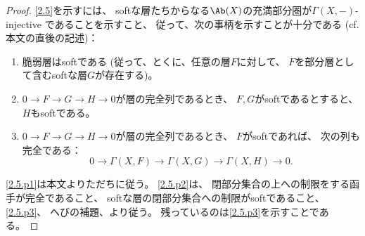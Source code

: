 \documentclass[uplatex,dvipdfmx]{jsarticle}
\begin{document}
\begin{proof}
  \autoref{2.5}を示すには、
  softな層たちからなる\(\Ab(X)\)の充満部分圏が\(\Gamma(X,-)\)-injective
  であることを示すこと、
  従って、次の事柄を示すことが十分である
  (cf. 本文\cite[Definition 1.8.2]{kashiwara2002sheaves}の直後の記述)：
  \begin{enumerate}
    \item \label{2.5.p1}
    脆弱層はsoftである
    (従って、とくに、任意の層\(F\)に対して、
    \(F\)を部分層として含むsoftな層\(G\)が存在する)。
    \item \label{2.5.p2}
    \(0\to F\to G\to H\to 0\)が層の完全列であるとき、
    \(F,G\)がsoftであるとすると、\(H\)もsoftである。
    \item \label{2.5.p3}
    \(0\to F\to G\to H\to 0\)が層の完全列であるとき、
    \(F\)がsoftであれば、
    次の列も完全である：
    \[
    0\to \Gamma(X,F) \to \Gamma(X,G) \to \Gamma(X,H)\to 0.
    \]
  \end{enumerate}
  \ref{2.5.p1}は本文\cite[Proposition 2.5.1 (iii)]{kashiwara2002sheaves}よりただちに従う。
  \ref{2.5.p2}は、
  閉部分集合の上への制限をする函手が完全であること、
  softな層の閉部分集合への制限がsoftであること、
  \ref{2.5.p3}、
  へびの補題、より従う。
  残っているのは\ref{2.5.p3}を示すことである。


\end{proof}
\end{document}

